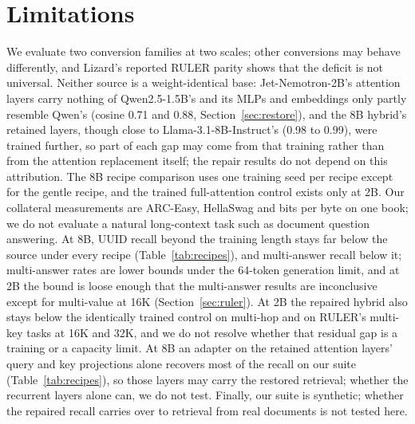\documentclass[11pt]{article}
\begin{document}
\section{Limitations}
\label{sec:limitations}
We evaluate two conversion families at two scales; other conversions may behave differently, and Lizard's reported RULER parity \citep{lizard2025} shows that the deficit is not universal. Neither source is a weight-identical base: Jet-Nemotron-2B's attention layers carry nothing of Qwen2.5-1.5B's and its MLPs and embeddings only partly resemble Qwen's (cosine 0.71 and 0.88, Section~\ref{sec:restore}), and the 8B hybrid's retained layers, though close to Llama-3.1-8B-Instruct's (0.98 to 0.99), were trained further, so part of each gap may come from that training rather than from the attention replacement itself; the repair results do not depend on this attribution. The 8B recipe comparison uses one training seed per recipe except for the gentle recipe, and the trained full-attention control exists only at 2B. Our collateral measurements are ARC-Easy, HellaSwag and bits per byte on one book; we do not evaluate a natural long-context task such as document question answering. At 8B, UUID recall beyond the training length stays far below the source under every recipe (Table~\ref{tab:recipes}), and multi-answer recall below it; multi-answer rates are lower bounds under the 64-token generation limit, and at 2B the bound is loose enough that the multi-answer results are inconclusive except for multi-value at 16K (Section~\ref{sec:ruler}). At 2B the repaired hybrid also stays below the identically trained control on multi-hop and on RULER's multi-key tasks at 16K and 32K, and we do not resolve whether that residual gap is a training or a capacity limit. At 8B an adapter on the retained attention layers' query and key projections alone recovers most of the recall on our suite (Table~\ref{tab:recipes}), so those layers may carry the restored retrieval; whether the recurrent layers alone can, we do not test. Finally, our suite is synthetic; whether the repaired recall carries over to retrieval from real documents is not tested here.
\end{document}
